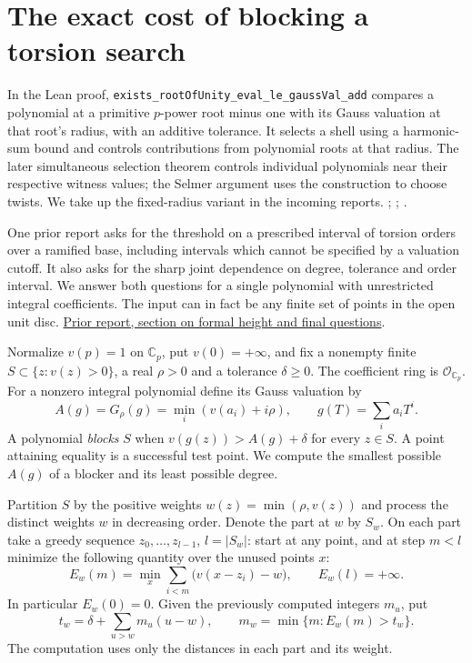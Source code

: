 \section{The exact cost of blocking a torsion search}
\label{sec:threshold}
In the Lean proof, \texttt{exists\_rootOfUnity\_eval\_le\_gaussVal\_add}
compares a polynomial at a primitive $p$-power root minus one with its Gauss
valuation at that root's radius, with an additive tolerance. It selects a
shell using a harmonic-sum bound and controls contributions from polynomial
roots at that radius. The later simultaneous selection theorem controls
individual polynomials near their respective witness values; the Selmer
argument uses the construction to choose twists. We take up the fixed-radius
variant in the incoming reports.
;
;
.

One prior report asks for the threshold on a prescribed interval of torsion
orders over a ramified base, including intervals which cannot be
specified by a valuation cutoff. It also asks for the sharp joint dependence
on degree, tolerance and order interval. We answer both questions for
a single polynomial with unrestricted integral coefficients. The input can
in fact be any finite set of points in the open unit disc.
\href{https://github.com/VladimirReshetnikov/ProveIt/blob/d31039a48d963692e5a5176f47b6603fc9e9d9cf/docs/incoming/grh_method_transfers_sharp_torsion.zip}{Prior report, section on formal height and final questions}.

Normalize $v(p)=1$ on $\mathbb C_p$, put $v(0)=+\infty$, and fix a
nonempty finite $S\subset\{z:v(z)>0\}$, a real $\rho>0$ and a tolerance
$\delta\ge0$. The coefficient ring is $\mathcal O_{\mathbb C_p}$.
For a nonzero integral polynomial define its Gauss valuation by
\[
 A(g)=G_\rho(g)=\min_i(v(a_i)+i\rho),\qquad g(T)=\sum_i a_iT^i.
\]
A polynomial \emph{blocks} $S$ when $v(g(z))>A(g)+\delta$ for every $z\in S$.
A point attaining equality is a successful test point.
We compute the smallest possible $A(g)$ of a blocker and its least possible degree.

Partition $S$ by the positive weights $w(z)=\min(\rho,v(z))$ and process
the distinct weights $w$ in decreasing order. Denote the part at $w$ by
$S_w$. On each part take a greedy sequence $z_0,\ldots,z_{l-1}$, $l=|S_w|$:
start at any point, and at step $m<l$ minimize the following quantity over
the unused points $x$:
\[
 E_w(m)=\min_x\sum_{i<m}\bigl(v(x-z_i)-w\bigr),\qquad E_w(l)=+\infty.
\]
In particular $E_w(0)=0$. Given the previously computed integers $m_u$, put
\begin{equation}\label{eq:rec}
 t_w=\delta+\sum_{u>w}m_u(u-w),\qquad
 m_w=\min\{m:E_w(m)>t_w\}.
\end{equation}
The computation uses only the distances in each part and its weight.


